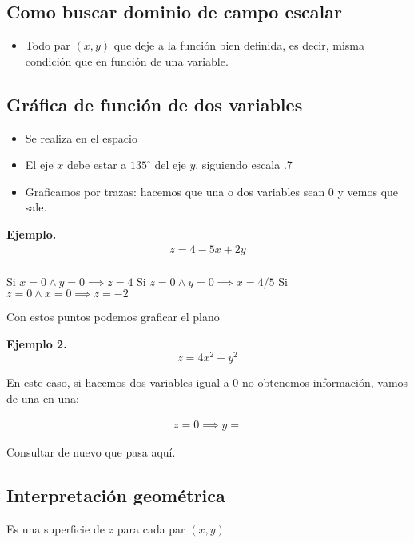 \subsection{Como buscar dominio de campo escalar}
\begin{itemize}
    \item Todo par \((x,y)\) que deje a la función bien definida,
    es decir, misma condición que en función de una variable.
\end{itemize}

\subsection{Gráfica de función de dos variables}
\begin{itemize}
    \item Se realiza en el espacio
    \item El eje \(x\) debe estar a \(135^{\circ}\) del eje \(y\),
    siguiendo escala .7
    \item Graficamos por trazas: 
    hacemos que una o dos variables sean 0 y vemos que sale.
\end{itemize}

\textbf{Ejemplo.}
\begin{align*}
    z = 4 - 5x + 2y \\
\end{align*}

Si \(x = 0 \land y = 0 \implies z = 4\)
Si \(z = 0 \land y = 0 \implies x = 4/5\)
Si \(z = 0 \land x = 0 \implies z = -2\)

Con estos puntos podemos graficar el plano

\textbf{Ejemplo 2.}
\begin{equation*}
    z = 4x^{2} + y^{2}
\end{equation*}

En este caso, si hacemos dos variables igual a 0 no obtenemos información,
vamos de una en una:

\begin{align*}
    z = 0 \implies y = 
\end{align*}

Consultar de nuevo que pasa aquí.

\subsection{Interpretación geométrica}

Es una superficie de \(z\) para cada par \((x,y)\)

